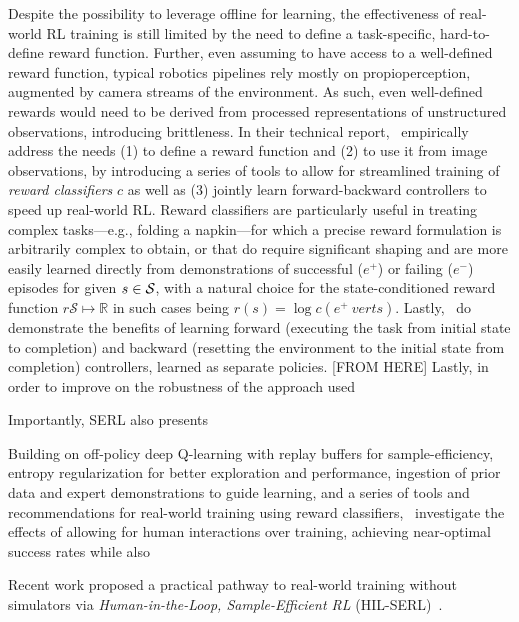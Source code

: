 Despite the possibility to leverage offline for learning, the effectiveness of real-world RL training is still limited by the need to define a task-specific, hard-to-define reward function.
Further, even assuming to have access to a well-defined reward function, typical robotics pipelines rely mostly on propioperception, augmented by camera streams of the environment.
As such, even well-defined rewards would need to be derived from processed representations of unstructured observations, introducing brittleness.
In their technical report,~\citet{luoSERLSoftwareSuite2025} empirically address the needs (1) to define a reward function and (2) to use it from image observations, by introducing a series of tools to allow for streamlined training of \emph{reward classifiers} \( c \) as well as (3) jointly learn forward-backward controllers to speed up real-world RL.
Reward classifiers are particularly useful in treating complex tasks---e.g., folding a napkin---for which a precise reward formulation is arbitrarily complex to obtain, or that do require significant shaping and are more easily learned directly from demonstrations of successful (\(e^+\)) or failing (\(e^-\)) episodes for given \( s \in \mathcal S \), with a natural choice for the state-conditioned reward function \( r \mathcal S \mapsto \mathbb R \) in such cases being \( r(s) = \log c(e^+ \ vert s ) \).
Lastly,~\citep{luoSERLSoftwareSuite2025} do demonstrate the benefits of learning forward (executing the task from initial state to completion) and backward (resetting the environment to the initial state from completion) controllers, learned as separate policies.
[FROM HERE]
Lastly, in order to improve on the robustness of the approach used 

Importantly, SERL also presents


Building on off-policy deep Q-learning with replay buffers for sample-efficiency, entropy regularization for better exploration and performance, ingestion of prior data and expert demonstrations to guide learning, and a series of tools and recommendations for real-world training using reward classifiers,~\citet{luoPreciseDexterousRobotic2024} investigate the effects of allowing for human interactions over training, achieving near-optimal success rates while also 

Recent work proposed a practical pathway to real-world training without simulators via \emph{Human-in-the-Loop, Sample-Efficient RL} (HIL-SERL)~\citep{luoPreciseDexterousRobotic2024}.

